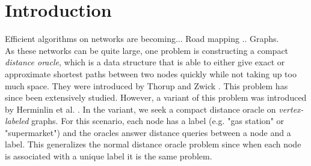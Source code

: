 \section{Introduction}
\label{sec:introduction}
Efficient algorithms on networks are becoming... Road mapping .. Graphs. \\
As these networks can be quite large, one problem is constructing a compact \textit{distance
oracle}, which is a data structure that is able to either give exact or approximate
shortest paths between two nodes quickly while not taking up too much space. They were
introduced by Thorup and Zwick \cite{thorup2005approximate}. This problem has since been
extensively studied. However, a variant of this problem
was introduced by Herminlin et al. \cite{hermelin2011distance}. In the variant, we seek a
compact distance oracle on \textit{vertex-labeled} graphs. For this scenario, each node has a label (e.g. "gas
station" or "supermarket") and the oracles answer distance queries between a node and a
label. This generalizes the normal distance oracle problem since when each node is
associated with a unique label it is the same problem. \\

